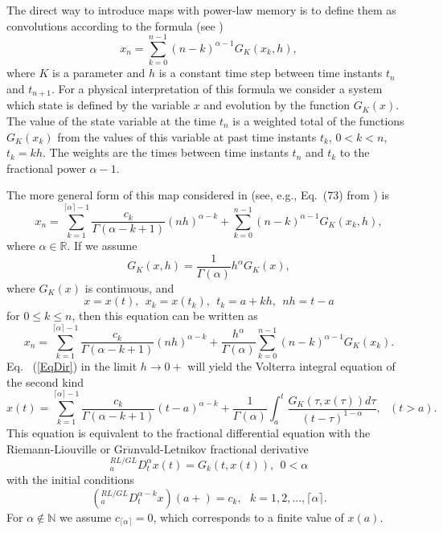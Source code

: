 \documentclass[graybox]{svmult}
\begin{document}
The direct way to introduce maps with power-law memory is to define them as convolutions according to the formula (see \cite{Chaos2015,StanislavskyMaps})
\begin{equation}
x_{n}=\sum^{n-1}_{k=0}(n-k)^{\alpha-1} G_K(x_k,h),
\label{LTMPL}
\end{equation}
where $K$ is a parameter and $h$ is a constant time step between 
time instants $t_n$ and $t_{n+1}$. For a physical interpretation of this formula we consider a system which state is defined by the variable $x$ and evolution by the function $G_K(x)$. The value of the state variable at the time $t_n$ is a weighted total of the functions $G_K(x_k)$ from the values of this variable at past time instants $t_k$, $0<k<n$, $t_k=kh$. The weights are the times between time instants $t_n$ and $t_k$ to the fractional power $\alpha-1$.

The more general form of this map considered in \cite{Chaos2015,StanislavskyMaps} (see, e.g., Eq.~(73) from \cite{Chaos2015}) is
\begin{equation}
x_{n}=\sum^{\lceil \alpha \rceil - 1}_{k=1}\frac{c_k}{\Gamma(\alpha-k+1)}
(nh)^{\alpha-k}  +\sum^{n-1}_{k=0}(n-k)^{\alpha-1} G_K(x_k,h),
\label{FrLTMPLNN}
\end{equation}
where $\alpha \in \mathbb{R}$. If we assume 
\begin{equation}
G_K(x,h)=\frac{1}{\Gamma (\alpha)}h^{\alpha}G_K(x), 
\label{FORxSmooth}
\end{equation}
where $G_K(x)$ is continuous, and \begin{equation}
x=x(t), \ \  x_k=x(t_k), \ \ t_k=a+kh, \ \ nh=t-a 
\label{GLDef}
\end{equation}
for $0 \le k \le n$, then this equation can be written as
\begin{equation}
x_{n}=\sum^{\lceil \alpha \rceil - 1}_{k=1}\frac{c_k}{\Gamma(\alpha-k+1)}
(nh)^{\alpha-k}  +\frac{h^{\alpha}}{\Gamma({\alpha})}\sum^{n-1}_{k=0}(n-k)^{\alpha-1} G_K(x_k).
\label{EqDir}
\end{equation}
Eq.~ (\ref{EqDir}) in the limit $h \rightarrow 0+$ 
will yield the Volterra integral equation of the second kind 
\begin{equation}
x(t)= \sum^{\lceil \alpha \rceil-1}_{k=1}\frac{c_k}{\Gamma(\alpha-k+1)}(t-a)^{\alpha-k}+\frac{1}{\Gamma (\alpha)}
\int^{t}_{a}\frac{G_K(\tau,x(\tau))d\tau}{(t-\tau)^{1-\alpha}}, \  \ \ (t>a). 
\label{VoltRealNN}
\end{equation}
This equation is equivalent to the fractional differential equation with the Riemann-Liouville or Gr$\ddot{u}$nvald-Letnikov fractional derivative \cite{Chaos2015,KBT1,KBT2}
\begin{equation}
_a^{RL/GL}D^{\alpha}_tx(t)=G_k(t,x(t)), \  \ 0 <\alpha
\label{KMRL}
\end{equation}
with the initial conditions 
\begin{equation}
(_a^{RL/GL}D^{\alpha-k}_tx) (a+)=c_k, \  \  \ k=1,2,...,\lceil \alpha \rceil.
\label{IC3}
\end{equation}
For $\alpha \not\in \mathbb{N}$ we assume $c_{\lceil \alpha \rceil}=0$, which corresponds to a finite value of $x(a)$.
\end{document}
